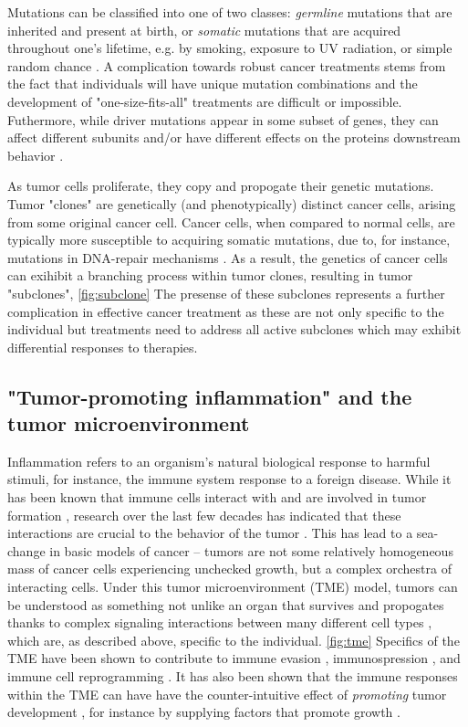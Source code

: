 Mutations can be classified into one of two classes:
\emph{germline} mutations that are inherited and present at birth, or
\emph{somatic} mutations that are acquired throughout one's lifetime, e.g. by smoking, exposure to UV radiation, or simple random chance \cite{need}.
A complication towards robust cancer treatments stems from the fact that individuals will have unique mutation combinations and the development of "one-size-fits-all" treatments are difficult or impossible.
Futhermore, while driver mutations appear in some subset of genes, they can affect different subunits and/or have different effects on the proteins downstream behavior \cite{smiech2020}.

As tumor cells proliferate, they copy and propogate their genetic mutations.
Tumor "clones" are genetically (and phenotypically) distinct cancer cells, arising from some original cancer cell.
Cancer cells, when compared to normal cells, are typically more susceptible to acquiring somatic mutations, due to, for instance, mutations in DNA-repair mechanisms \cite{negrini2010,salk2010}.
As a result, the genetics of cancer cells can exihibit a branching process within tumor clones, resulting in tumor "subclones", \ref{fig:subclone}
The presense of these subclones represents a further complication in effective cancer treatment as these are not only specific to the individual but treatments need to address all active subclones which may exhibit differential responses to therapies.

\subsection{"Tumor-promoting inflammation" and the tumor microenvironment}
Inflammation refers to an organism's natural biological response to harmful stimuli,
for instance, the immune system response to a foreign disease.
While it has been known that immune cells interact with and are involved in tumor formation \cite{need}, research over the last few decades has indicated that these interactions are crucial to the behavior of the tumor \cite{need}.
This has lead to a sea-change in basic models of cancer -- tumors are not some relatively homogeneous mass of cancer cells experiencing unchecked growth, but a complex orchestra of interacting cells.
Under this tumor microenvironment (TME) model, tumors can be understood as something not unlike an organ that survives and propogates thanks to complex signaling interactions between many different cell types \cite{balkwill2012}, which are, as described above, specific to the individual. \ref{fig:tme}
Specifics of the TME have been shown to contribute to immune evasion \cite{pansy2021},
immunospression \cite{balta2021}, and immune cell reprogramming \cite{cao2022}.
It has also been shown that the immune responses within the TME can have 
have the counter-intuitive effect of \emph{promoting} tumor development \cite{hanahan2011}, for instance by supplying factors that promote growth \cite{denardo2010}. %

